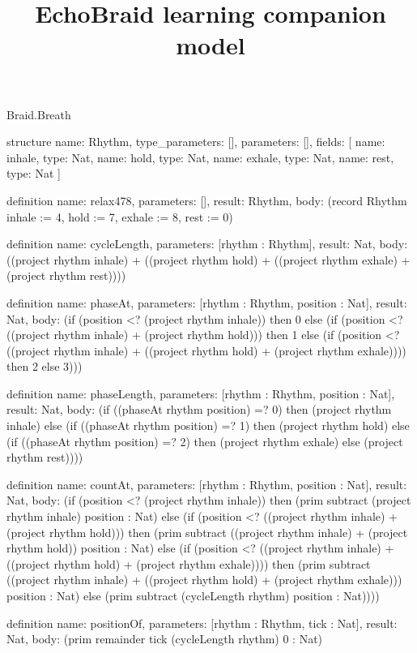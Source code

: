 \begin{lexlean}{Braid.Breath}
\title{EchoBraid learning companion model}
\begin{semanticmodule}
structure{
  name: Rhythm,
  type_parameters: [],
  parameters: [],
  fields: [
    {name: inhale, type: Nat},
    {name: hold, type: Nat},
    {name: exhale, type: Nat},
    {name: rest, type: Nat}
  ]
}

definition{
  name: relax478,
  parameters: [],
  result: Rhythm,
  body: (record Rhythm {inhale := 4, hold := 7, exhale := 8, rest := 0})
}

definition{
  name: cycleLength,
  parameters: [rhythm : Rhythm],
  result: Nat,
  body: ((project rhythm inhale) + ((project rhythm hold) + ((project rhythm exhale) + (project rhythm rest))))
}

definition{
  name: phaseAt,
  parameters: [rhythm : Rhythm, position : Nat],
  result: Nat,
  body: (if (position <? (project rhythm inhale)) then 0 else (if (position <? ((project rhythm inhale) + (project rhythm hold))) then 1 else (if (position <? ((project rhythm inhale) + ((project rhythm hold) + (project rhythm exhale)))) then 2 else 3)))
}

definition{
  name: phaseLength,
  parameters: [rhythm : Rhythm, position : Nat],
  result: Nat,
  body: (if ((phaseAt rhythm position) =? 0) then (project rhythm inhale) else (if ((phaseAt rhythm position) =? 1) then (project rhythm hold) else (if ((phaseAt rhythm position) =? 2) then (project rhythm exhale) else (project rhythm rest))))
}

definition{
  name: countAt,
  parameters: [rhythm : Rhythm, position : Nat],
  result: Nat,
  body: (if (position <? (project rhythm inhale)) then (prim subtract (project rhythm inhale) position : Nat) else (if (position <? ((project rhythm inhale) + (project rhythm hold))) then (prim subtract ((project rhythm inhale) + (project rhythm hold)) position : Nat) else (if (position <? ((project rhythm inhale) + ((project rhythm hold) + (project rhythm exhale)))) then (prim subtract ((project rhythm inhale) + ((project rhythm hold) + (project rhythm exhale))) position : Nat) else (prim subtract (cycleLength rhythm) position : Nat))))
}

definition{
  name: positionOf,
  parameters: [rhythm : Rhythm, tick : Nat],
  result: Nat,
  body: (prim remainder tick (cycleLength rhythm) 0 : Nat)
}


\end{semanticmodule}
\end{lexlean}
